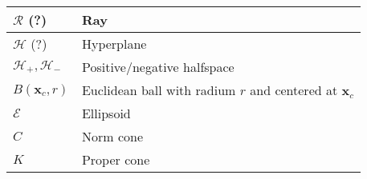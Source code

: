\begin{xltabular}{\textwidth}{XX}
	\(\mathcal{R}\) (?)                                                                                                          & Ray                                                                                                                                                                                                            \\ \hline
	\(\mathcal{H}\) (?)                                                                                                          & Hyperplane                                                                                                                                                                                                     \\ \hline
	\(\mathcal{H}_{+}, \mathcal{H}_{-}\) \cite[sec. 2.4]{dattorroConvexOptimizationEuclidean2010}                                                                                     & Positive/negative halfspace                                                                                                                                                                                    \\ \hline
	\(B(\mathbf{x}_c, r)\) \cite[sec. 2.2.2]{boydAdditionalExercisesConvex}                                                                                                   & Euclidean ball with radium \(r\) and centered at \(\mathbf{x}_c\)                                                                                                                                              \\ \hline
	\(\mathcal{E}\) \cite[sec. 2.2.2]{boydAdditionalExercisesConvex}                                                                                                          & Ellipsoid                                                                                                                                                                                                      \\ \hline
	\(C\) \cite[sec. 2.2.3]{boydConvexOptimization2004}                                                                                                                    & Norm cone                                                                                                                                                                                                      \\ \hline
	\(K\) \cite[sec. 2.4]{boydAdditionalExercisesConvex}                                                                                                                    & Proper cone                                                                                                                                                                                                    \\ \hline

\end{xltabular}
